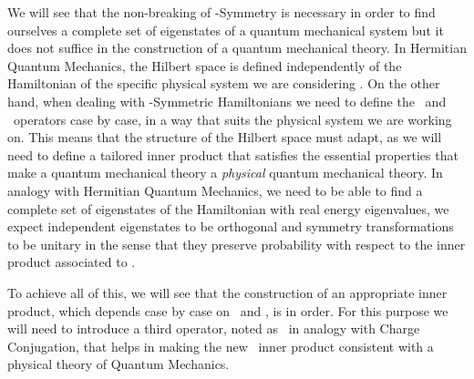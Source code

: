        We will see that the non-breaking of \PT-Symmetry is necessary in order to find ourselves a complete set of eigenstates of a quantum mechanical system but it does not suffice in the construction of a quantum mechanical theory. In Hermitian Quantum Mechanics, the Hilbert space is defined independently of the Hamiltonian of the specific physical system we are considering \cite{bender2024}. On the other hand, when dealing with \PT-Symmetric Hamiltonians we need to define the \hP\ and \hT\ operators case by case, in a way that suits the physical system we are working on. This means that the structure of the Hilbert space must adapt, as we will need to define a tailored inner product that satisfies the essential properties that make a quantum mechanical theory a \emph{physical} quantum mechanical theory. In analogy with Hermitian Quantum Mechanics, we need to be able to find a complete set of eigenstates of the Hamiltonian with real energy eigenvalues, we expect independent eigenstates to be orthogonal and symmetry transformations to be unitary in the sense that they preserve probability with respect to the inner product associated to \hPT.
        
        To achieve all of this, we will see that the construction of an appropriate inner product, which depends case by case on \hP\ and \hT, is in order. For this purpose we will need to introduce a third operator, noted as \hC\ in analogy with Charge Conjugation, that helps in making the new \CPT\ inner product consistent with a physical theory of Quantum Mechanics.

